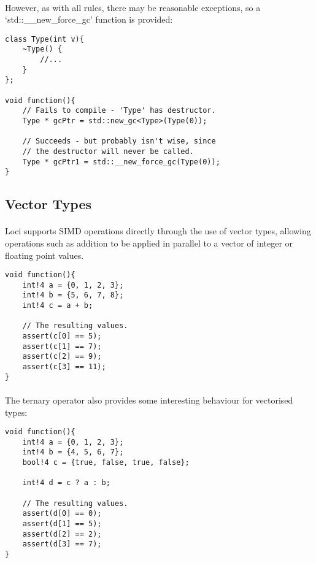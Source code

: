 \documentclass[12pt,twoside,notitlepage]{report}
\begin{document}
\paragraph{}
However, as with all rules, there may be reasonable exceptions, so a `std::\_\_new\_force\_gc' function is provided:


\begin{lstlisting}
class Type(int v){
	~Type() {
		//...
	}
};

void function(){
	// Fails to compile - 'Type' has destructor.
	Type * gcPtr = std::new_gc<Type>(Type(0));
	
	// Succeeds - but probably isn't wise, since 
	// the destructor will never be called.
	Type * gcPtr1 = std::__new_force_gc(Type(0));
}
\end{lstlisting}

\clearpage

\subsection{Vector Types}

\paragraph{}
Loci supports SIMD operations directly through the use of vector types, allowing operations such as addition to be applied in parallel to a vector of integer or floating point values.


\begin{lstlisting}
void function(){
	int!4 a = {0, 1, 2, 3};
	int!4 b = {5, 6, 7, 8};
	int!4 c = a + b;
	
	// The resulting values.
	assert(c[0] == 5);
	assert(c[1] == 7);
	assert(c[2] == 9);
	assert(c[3] == 11);
}
\end{lstlisting}


\paragraph{}
The ternary operator also provides some interesting behaviour for vectorised types:


\begin{lstlisting}
void function(){
	int!4 a = {0, 1, 2, 3};
	int!4 b = {4, 5, 6, 7};
	bool!4 c = {true, false, true, false};
	
	int!4 d = c ? a : b;
	
	// The resulting values.
	assert(d[0] == 0);
	assert(d[1] == 5);
	assert(d[2] == 2);
	assert(d[3] == 7);
}
\end{lstlisting}
\end{document}
